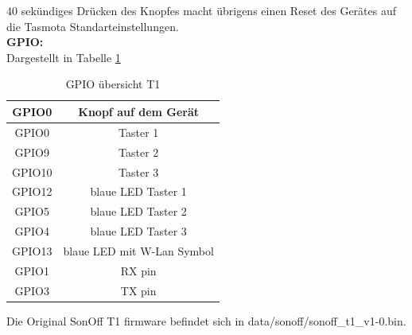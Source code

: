 \documentclass[11pt,fleqn]{book} %
\numberwithin{equation}{section} %
\numberwithin{figure}{section} %
\numberwithin{table}{section} %
\begin{document}
40 sekündiges Drücken des Knopfes macht übrigens einen Reset des Gerätes auf die Tasmota Standarteinstellungen.\\
\textbf{GPIO:}\\
Dargestellt in Tabelle \ref{tab:sonoff-gpiot1}
\begin{table}
\center
\begin{tabular}{|c|c|}\hline
GPIO0 & Knopf auf dem Gerät\\ \hline
GPIO0& Taster 1\\ \hline
GPIO9& Taster 2\\ \hline
GPIO10& Taster 3\\ \hline
GPIO12& blaue LED Taster 1\\ \hline
GPIO5& blaue LED Taster 2\\ \hline
GPIO4& blaue LED Taster 3\\ \hline
GPIO13& blaue LED mit W-Lan Symbol\\ \hline
GPIO1& RX pin \\ \hline
GPIO3& TX pin \\ \hline
\end{tabular}
\caption{GPIO übersicht T1\label{tab:sonoff-gpiot1}}
\end{table}
Die Original SonOff T1 firmware befindet sich in data/sonoff/sonoff\_t1\_v1-0.bin.
\end{document}
